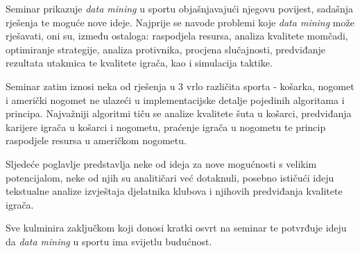 \documentclass{ferseminar}
\begin{document}
Seminar prikazuje \textit{data mining} u sportu objašnjavajući njegovu povijest, sadašnja rješenja te moguće nove ideje. Najprije se navode problemi koje \textit{data mining} može rješavati, oni su, između ostaloga: raspodjela resursa, analiza kvalitete momčadi, optimiranje strategije, analiza protivnika, procjena slučajnosti, predviđanje rezultata utakmica te kvalitete igrača, kao i simulacija taktike.

Seminar zatim iznosi neka od rješenja u 3 vrlo različita sporta - košarka, nogomet i američki nogomet ne ulazeći u implementacijske detalje pojedinih algoritama i principa. Najvažniji algoritmi tiču se analize kvalitete šuta u košarci, predviđanja karijere igrača u košarci i nogometu, praćenje igrača u nogometu te princip raspodjele resursa u američkom nogometu.

Sljedeće poglavlje predstavlja neke od ideja za nove mogućnosti s velikim potencijalom, neke od njih su analitičari već dotaknuli, posebno ističući ideju tekstualne analize izvještaja djelatnika klubova i njihovih predviđanja kvalitete igrača.

Sve kulminira zaključkom koji donosi kratki osvrt na seminar te potvrđuje ideju da \textit{data mining} u sportu ima svijetlu budućnost.
\end{document}
